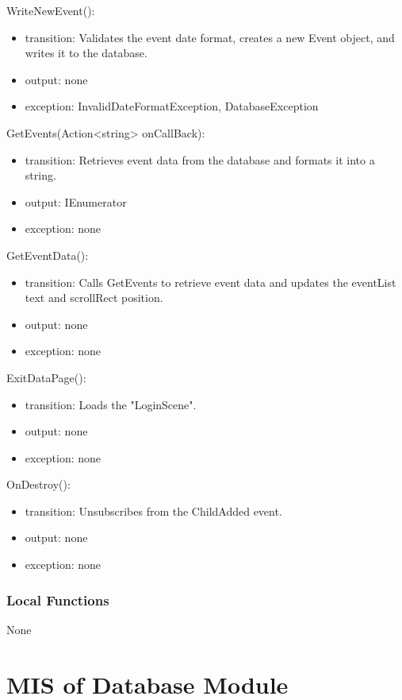 \documentclass[12pt, titlepage]{article}
\begin{document}
\begin{itemize}
\noindent WriteNewEvent():
\begin{itemize}
\item transition: Validates the event date format, creates a new Event object, and writes it to the database.
\item output: none
\item exception: InvalidDateFormatException, DatabaseException
\end{itemize}

\noindent GetEvents(Action<string> onCallBack):
\begin{itemize}
\item transition: Retrieves event data from the database and formats it into a string.
\item output: IEnumerator
\item exception: none
\end{itemize}

\noindent GetEventData():
\begin{itemize}
\item transition: Calls GetEvents to retrieve event data and updates the eventList text and scrollRect position.
\item output: none
\item exception: none
\end{itemize}

\noindent ExitDataPage():
\begin{itemize}
\item transition: Loads the "LoginScene".
\item output: none
\item exception: none
\end{itemize}

\noindent OnDestroy():
\begin{itemize}
\item transition: Unsubscribes from the ChildAdded event.
\item output: none
\item exception: none
\end{itemize}

\subsubsection{Local Functions}

None

\newpage

\section{MIS of Database Module} \label{mDB}


\end{itemize}
\end{document}
